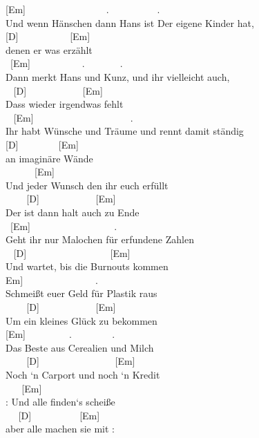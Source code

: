 \documentclass[
  letterpaper,
  twoside=false]{scrbook}
\begin{document}
{[}Em{]} ~ ~ ~ ~ ~ ~ ~ ~ ~ ~. ~ ~ ~ ~ ~ ~. ~\\
Und wenn Hänschen dann Hans ist Der eigene Kinder hat,\\
{[}D{]} ~ ~ ~ ~ ~ ~ {[}Em{]}\\
denen er was erzählt\\
\hspace*{0.333em} ~{[}Em{]} ~ ~ ~ ~ ~ ~ . ~ ~ ~ ~ .\\
Dann merkt Hans und Kunz, und ihr vielleicht auch,\\
\hspace*{0.333em} ~ {[}D{]} ~ ~ ~ ~ ~ ~ ~{[}Em{]}\\
Dass wieder irgendwas fehlt\\
\hspace*{0.333em} ~ {[}Em{]} ~ ~ ~ ~ ~ ~ ~ ~ ~ ~ ~ ~.\\
Ihr habt Wünsche und Träume und rennt damit ständig\\
{[}D{]} ~ ~ ~ ~ ~{[}Em{]}\\
an imaginäre Wände\\
\hspace*{0.333em} ~ ~ ~ ~{[}Em{]}\\
Und jeder Wunsch den ihr euch erfüllt\\
\hspace*{0.333em} ~ ~ ~{[}D{]} ~ ~ ~ ~ ~ ~ ~{[}Em{]}\\
Der ist dann halt auch zu Ende\\
\hspace*{0.333em} ~{[}Em{]} ~ ~ ~ ~ ~ ~ ~ ~ ~ ~ .\\
Geht ihr nur Malochen für erfundene Zahlen\\
\hspace*{0.333em} ~ {[}D{]} ~ ~ ~ ~ ~ ~ ~ ~ ~ ~ {[}Em{]}\\
Und wartet, bis die Burnouts kommen\\
\hspace*{0.333em}{[}Em{]} ~ ~ ~ ~ ~ ~ ~ ~ ~.\\
Schmeißt euer Geld für Plastik raus\\
\hspace*{0.333em} ~ ~ ~{[}D{]} ~ ~ ~ ~ ~ ~ ~{[}Em{]}\\
Um ein kleines Glück zu bekommen\\
\hspace*{0.333em} {[}Em{]} ~ ~ ~ ~ ~ . ~ ~ ~ ~ ~.\\
Das Beste aus Cerealien und Milch\\
\hspace*{0.333em} ~ ~ ~{[}D{]} ~ ~ ~ ~ ~ ~ ~ ~ ~ {[}Em{]}\\
Noch `n Carport und noch `n Kredit\\
\hspace*{0.333em} ~ ~ {[}Em{]}\\
\textbar: Und alle finden`s scheiße ~ ~ ~ ~\\
\hspace*{0.333em} ~ ~{[}D{]} ~ ~ ~ ~ ~ ~{[}Em{]}\\
aber alle machen sie mit :\textbar{} ~ ~ ~ ~
\end{document}
